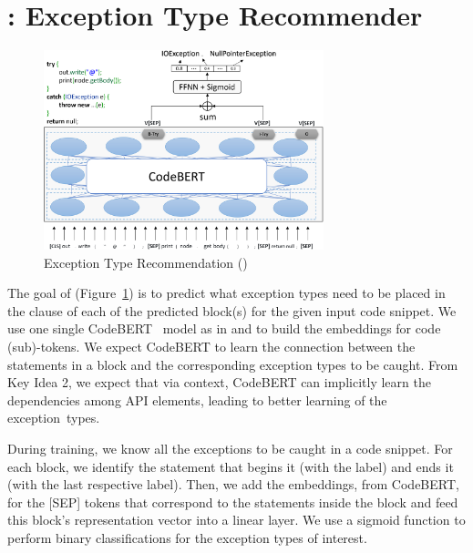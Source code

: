 \section{{\xtype}: Exception Type Recommender}
\label{sec:xtype}

\begin{figure}[t]
\begin{center}
\includegraphics[width=3.2in]{xtype-6.png}
\vspace{-8pt}
\caption{Exception Type Recommendation ({\xtype})}
\label{fig:xtype}
\end{center}
\end{figure}

The goal of {\xtype} (Figure~\ref{fig:xtype}) is to predict what
exception types need to be placed in the  clause of each
of the predicted  block(s) for the given input code
snippet. We use one single CodeBERT~\cite{codebert-emnlp20} model as
in {\xblock} and {\xstate} to build the embeddings for code (sub)-tokens.
%
We expect CodeBERT to learn the connection between the statements in a
 block and the corresponding exception types to be
caught. From Key Idea 2, we expect that via context, CodeBERT can
implicitly learn the dependencies among API elements, leading to
better learning of the exception~types.

During training, we know all the exceptions to be caught in a code
snippet. For each  block, we identify the statement
that begins it (with the  label) and ends it (with the
last respective  label). Then, we add the embeddings, from
CodeBERT, for the [SEP] tokens that correspond to the statements
inside the  block and feed this  block's representation vector into a linear layer.
We use a sigmoid function to perform binary classifications for the
exception types of interest.

